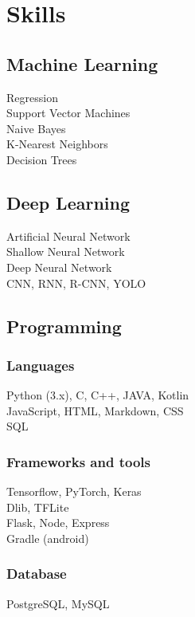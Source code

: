 \section{Skills}

\subsection{Machine Learning}
Regression \\
Support Vector Machines \\
Naive Bayes \\
K-Nearest Neighbors \\
Decision Trees \\

\sectionspace %

\subsection{Deep Learning}
Artificial Neural Network \\
Shallow Neural Network \\
Deep Neural Network \\
CNN, RNN, R-CNN, YOLO \\

\sectionspace

\subsection{Programming}

\subsubsection*{Languages}
Python (3.x), C, C++, JAVA, Kotlin \\
JavaScript, HTML, Markdown, CSS \\
SQL \\

\subsubsection*{Frameworks and tools}
Tensorflow, PyTorch, Keras\\
Dlib, TFLite \\
Flask, Node, Express \\
Gradle (android) \\

\subsubsection*{Database}
PostgreSQL, MySQL \\

